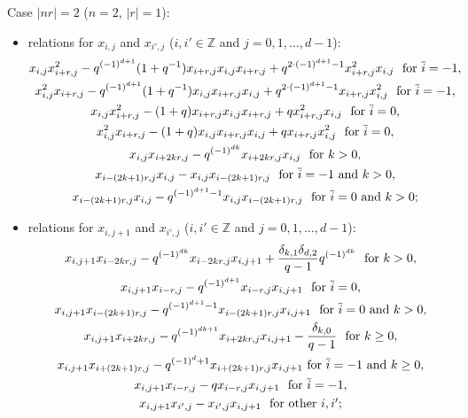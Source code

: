 \documentclass[reqno,12pt,a4paper]{amsart}
\theoremstyle{remark}
\theoremstyle{definition}
\numberwithin{equation}{section}
\begin{document}
\smallskip
\noindent Case $|nr|=2$ ($n=2$, $|r|=1$):
\begin{itemize}
   \item[(1)] relations for $x_{i,j}$ and $x_{i',j}$ ($i,i'\in\mathbb{Z}$ and $j=0,1,\ldots,d-1$):
   \begin{gather*}
   x_{i,j}x_{i+r,j}^2-q^{(-1)^{d+1}}(1+q^{-1})x_{i+r,j}x_{i,j}x_{i+r,j}+q^{2\cdot(-1)^{d+1}-1}x_{i+r,j}^2x_{i,j} ~\hbox{ for $\overline{i}=-1$},\\
    x_{i,j}^2x_{i+r,j}-q^{(-1)^{d+1}}(1+q^{-1})x_{i,j}x_{i+r,j}x_{i,j}+q^{2\cdot(-1)^{d+1}-1}x_{i+r,j}x_{i,j}^2 ~\hbox{ for $\overline{i}=-1$},\\
     x_{i,j}x_{i+r,j}^2-(1+q)x_{i+r,j}x_{i,j}x_{i+r,j}+qx_{i+r,j}^2x_{i,j} ~\hbox{ for $\overline{i}=0$},\\
    x_{i,j}^2x_{i+r,j}-(1+q)x_{i,j}x_{i+r,j}x_{i,j}+qx_{i+r,j}x_{i,j}^2 ~\hbox{ for $\overline{i}=0$},\\
    x_{i,j}x_{i+2kr,j}-q^{(-1)^{dk}}x_{i+2kr,j}x_{i,j} ~\hbox{ for } k>0,\\
    x_{i-(2k+1)r,j}x_{i,j}-x_{i,j}x_{i-(2k+1)r,j} ~\hbox{ for $\overline{i}=-1$ and $k>0$},\\
    x_{i-(2k+1)r,j}x_{i,j}-q^{(-1)^{d+1}-1}x_{i,j}x_{i-(2k+1)r,j} ~\hbox{ for $\overline{i}=0$ and $k>0$};    
   \end{gather*}

\item[(2)] relations for $x_{i,j+1}$ and $x_{i',j}$ ($i,i'\in\mathbb{Z}$ and $j=0,1,\ldots,d-1$):
  \begin{gather*}
  x_{i,j+1}x_{i-2kr,j}-q^{(-1)^{dk}}x_{i-2kr,j}x_{i,j+1}+\frac{\delta_{k,1}\delta_{d,2}}{q-1}q^{(-1)^{dk}} ~\hbox{ for } k>0,\\
    x_{i,j+1}x_{i-r,j}-q^{(-1)^{d+1}}x_{i-r,j}x_{i,j+1} ~\hbox{ for $\overline{i}=0$},\\
  x_{i,j+1}x_{i-(2k+1)r,j}-q^{(-1)^{d+1}-1}x_{i-(2k+1)r,j}x_{i,j+1} ~\hbox{ for $\overline{i}=0$ and $k>0$},\\
  x_{i,j+1}x_{i+2kr,j}-q^{(-1)^{dk+1}}x_{i+2kr,j}x_{i,j+1}-\frac{\delta_{k,0}}{q-1} ~\hbox{ for } k\geq0,\\
  x_{i,j+1}x_{i+(2k+1)r,j}-q^{(-1)^{d}+1}x_{i+(2k+1)r,j}x_{i,j+1} \hbox{ for $\overline{i}=-1$ and $k\geq 0$},\\
  x_{i,j+1}x_{i-r,j}- qx_{i-r,j}x_{i,j+1} ~\hbox{ for $\overline{i}=-1$},\\
  x_{i,j+1}x_{i',j}-x_{i',j}x_{i,j+1} ~\hbox{ for other  $i,i'$};
  \end{gather*}
  

\end{itemize}
\end{document}
